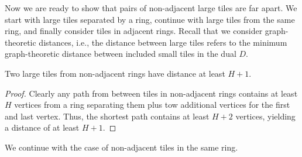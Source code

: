 \documentclass[a4paper,english,cleveref,thm-restate]{lipics-v2021}
\begin{document}
Now we are ready to show that pairs of non-adjacent large tiles are far apart.
We start with large tiles separated by a ring, continue with large tiles from the same ring, and finally consider tiles in adjacent rings.
Recall that we consider graph-theoretic distances, i.e., the distance between large tiles refers to the minimum graph-theoretic distance between included small tiles in the dual $D$.

\begin{lemma}
    \label{lem:tiling_large_r_non_adj_rings}
    Two large tiles from non-adjacent rings have distance at least $H + 1$.
\end{lemma}
\begin{proof}
    Clearly any path from between tiles in non-adjacent rings contains at least $H$ vertices from a ring separating them plus tow additional vertices for the first and last vertex.
    Thus, the shortest path contains at least $H + 2$ vertices, yielding a distance of at least $H + 1$.
\end{proof}

We continue with the case of non-adjacent tiles in the same ring.
\end{document}
